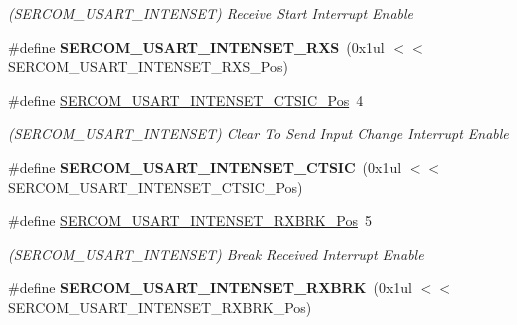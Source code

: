 \begin{DoxyCompactItemize}
\begin{DoxyCompactList}\small\item\em (S\+E\+R\+C\+O\+M\+\_\+\+U\+S\+A\+R\+T\+\_\+\+I\+N\+T\+E\+N\+S\+E\+T) Receive Start Interrupt Enable \end{DoxyCompactList}\item 
\hypertarget{group___s_a_m_l21___s_e_r_c_o_m_ga6f1edd17798464aeb071a9ee6867a1e3}{}\#define {\bfseries S\+E\+R\+C\+O\+M\+\_\+\+U\+S\+A\+R\+T\+\_\+\+I\+N\+T\+E\+N\+S\+E\+T\+\_\+\+R\+X\+S}~(0x1ul $<$$<$ S\+E\+R\+C\+O\+M\+\_\+\+U\+S\+A\+R\+T\+\_\+\+I\+N\+T\+E\+N\+S\+E\+T\+\_\+\+R\+X\+S\+\_\+\+Pos)\label{group___s_a_m_l21___s_e_r_c_o_m_ga6f1edd17798464aeb071a9ee6867a1e3}

\item 
\hypertarget{group___s_a_m_l21___s_e_r_c_o_m_gac67f1df9d06997bc53fd56c2c77138a7}{}\#define \hyperlink{group___s_a_m_l21___s_e_r_c_o_m_gac67f1df9d06997bc53fd56c2c77138a7}{S\+E\+R\+C\+O\+M\+\_\+\+U\+S\+A\+R\+T\+\_\+\+I\+N\+T\+E\+N\+S\+E\+T\+\_\+\+C\+T\+S\+I\+C\+\_\+\+Pos}~4\label{group___s_a_m_l21___s_e_r_c_o_m_gac67f1df9d06997bc53fd56c2c77138a7}

\begin{DoxyCompactList}\small\item\em (S\+E\+R\+C\+O\+M\+\_\+\+U\+S\+A\+R\+T\+\_\+\+I\+N\+T\+E\+N\+S\+E\+T) Clear To Send Input Change Interrupt Enable \end{DoxyCompactList}\item 
\hypertarget{group___s_a_m_l21___s_e_r_c_o_m_gae2b346bc646179ee2b193f56bf2903e5}{}\#define {\bfseries S\+E\+R\+C\+O\+M\+\_\+\+U\+S\+A\+R\+T\+\_\+\+I\+N\+T\+E\+N\+S\+E\+T\+\_\+\+C\+T\+S\+I\+C}~(0x1ul $<$$<$ S\+E\+R\+C\+O\+M\+\_\+\+U\+S\+A\+R\+T\+\_\+\+I\+N\+T\+E\+N\+S\+E\+T\+\_\+\+C\+T\+S\+I\+C\+\_\+\+Pos)\label{group___s_a_m_l21___s_e_r_c_o_m_gae2b346bc646179ee2b193f56bf2903e5}

\item 
\hypertarget{group___s_a_m_l21___s_e_r_c_o_m_ga9cd093b01b27d62445a007d4112216d4}{}\#define \hyperlink{group___s_a_m_l21___s_e_r_c_o_m_ga9cd093b01b27d62445a007d4112216d4}{S\+E\+R\+C\+O\+M\+\_\+\+U\+S\+A\+R\+T\+\_\+\+I\+N\+T\+E\+N\+S\+E\+T\+\_\+\+R\+X\+B\+R\+K\+\_\+\+Pos}~5\label{group___s_a_m_l21___s_e_r_c_o_m_ga9cd093b01b27d62445a007d4112216d4}

\begin{DoxyCompactList}\small\item\em (S\+E\+R\+C\+O\+M\+\_\+\+U\+S\+A\+R\+T\+\_\+\+I\+N\+T\+E\+N\+S\+E\+T) Break Received Interrupt Enable \end{DoxyCompactList}\item 
\hypertarget{group___s_a_m_l21___s_e_r_c_o_m_ga09934da3dc72c3c8bafcbfa6d2169972}{}\#define {\bfseries S\+E\+R\+C\+O\+M\+\_\+\+U\+S\+A\+R\+T\+\_\+\+I\+N\+T\+E\+N\+S\+E\+T\+\_\+\+R\+X\+B\+R\+K}~(0x1ul $<$$<$ S\+E\+R\+C\+O\+M\+\_\+\+U\+S\+A\+R\+T\+\_\+\+I\+N\+T\+E\+N\+S\+E\+T\+\_\+\+R\+X\+B\+R\+K\+\_\+\+Pos)\label{group___s_a_m_l21___s_e_r_c_o_m_ga09934da3dc72c3c8bafcbfa6d2169972}


\end{DoxyCompactItemize}
